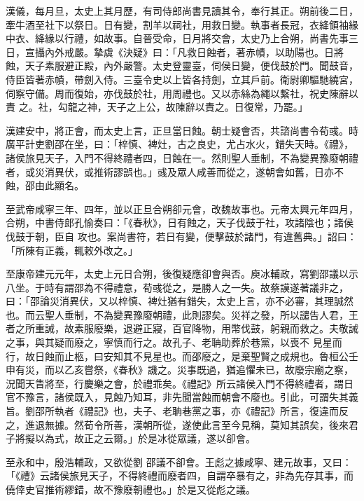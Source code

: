 \begin{pinyinscope}
 漢儀，每月旦，太史上其月歷，有司侍郎尚書見讀其令，奉行其正。朔前後二日，牽牛酒至社下以祭日。日有變，割羊以祠社，用救日變。執事者長冠，衣絳領袖緣中衣、絳緣以行禮，如故事。自晉受命，日月將交會，太史乃上合朔，尚書先事三日，宣攝內外戒嚴。摯虞《決疑》曰：「凡救日蝕者，著赤幘，以助陽也。日將蝕，天子素服避正殿，內外嚴警。太史登靈臺，伺侯日變，便伐鼓於門。聞鼓音，侍臣皆著赤幘，帶劍入侍。三臺令史以上皆各持劍，立其戶前。衛尉卿驅馳繞宮，伺察守備。周而復始，亦伐鼓於社，用周禮也。又以赤絲為繩以繫社，祝史陳辭以責
 之。社，勾龍之神，天子之上公，故陳辭以責之。日復常，乃罷。」



 漢建安中，將正會，而太史上言，正旦當日蝕。朝士疑會否，共諮尚書令荀彧。時廣平計吏劉邵在坐，曰：「梓慎、裨灶，古之良史，尤占水火，錯失天時。《禮》，諸侯旅見天子，入門不得終禮者四，日蝕在一。然則聖人垂制，不為變異豫廢朝禮者，或災消異伏，或推術謬誤也。」彧及眾人咸善而從之，遂朝會如舊，日亦不蝕，邵由此顯名。



 至武帝咸寧三年、四年，並以正旦合朔卻元會，改魏故事也。元帝太興元年四月，合朔，中書侍郎孔愉奏曰：「《春秋》，日有蝕之，天子伐鼓于社，攻諸陰也；諸侯伐鼓于朝，臣自
 攻也。案尚書符，若日有變，便擊鼓於諸門，有違舊典。」詔曰：「所陳有正義，輒敕外改之。」



 至康帝建元元年，太史上元日合朔，後復疑應卻會與否。庾冰輔政，寫劉邵議以示八坐。于時有謂邵為不得禮意，荀彧從之，是勝人之一失。故蔡謨遂著議非之，曰：「邵論災消異伏，又以梓慎、裨灶猶有錯失，太史上言，亦不必審，其理誠然也。而云聖人垂制，不為變異豫廢朝禮，此則謬矣。災祥之發，所以譴告人君，王者之所重誡，故素服廢樂，退避正寢，百官降物，用幣伐鼓，躬親而救之。夫敬誡之事，與其疑而廢之，寧慎而行之。故孔子、老聃助葬於巷黨，以喪不
 見星而行，故日蝕而止柩，曰安知其不見星也。而邵廢之，是棄聖賢之成規也。魯桓公壬申有災，而以乙亥嘗祭，《春秋》譏之。災事既過，猶追懼未已，故廢宗廟之察，況聞天眚將至，行慶樂之會，於禮乖矣。《禮記》所云諸侯入門不得終禮者，謂日官不豫言，諸侯既入，見蝕乃知耳，非先聞當蝕而朝會不廢也。引此，可謂失其義旨。劉邵所執者《禮記》也，夫子、老聃巷黨之事，亦《禮記》所言，復違而反之，進退無據。然荀令所善，漢朝所從，遂使此言至今見稱，莫知其誤矣，後來君子將擬以為式，故正之云爾。」於是冰從眾議，遂以卻會。



 至永和中，殷浩輔政，又欲從劉
 邵議不卻會。王彪之據咸寧、建元故事，又曰：「《禮》云諸侯旅見天子，不得終禮而廢者四，自謂卒暴有之，非為先存其事，而僥倖史官推術繆錯，故不豫廢朝禮也。」於是又從彪之議。




\end{pinyinscope}
